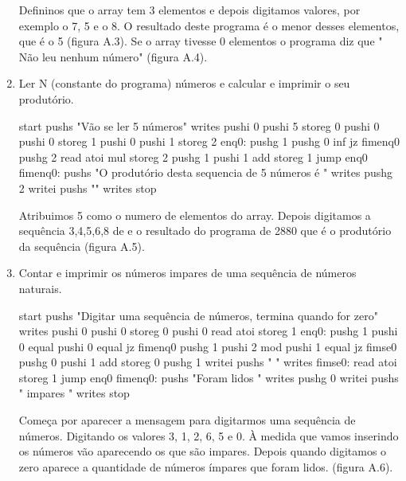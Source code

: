 \documentclass{report}
\begin{document}
\begin{enumerate}
	\indent
	Defininos que o array tem 3 elementos e depois digitamos valores, por exemplo o 7, 5 e o 8. O resultado deste programa é o menor desses elementos, que é o 5 (figura A.3). Se o array tivesse 0 elementos o programa diz que " 
	Não leu nenhum número" (figura A.4).
	\item Ler N (constante do programa) números e calcular e imprimir o seu produtório.
	
	\begin{code}
		start
		pushs "Vão se ler 5 números\n"
		writes
		pushi 0
		pushi 5
		storeg 0
		pushi 0
		pushi 0
		storeg 1
		pushi 0
		pushi 1
		storeg 2
		enq0:
		pushg 1
		pushg 0
		inf
		jz fimenq0
		pushg 2
		read
		atoi
		mul
		storeg 2
		pushg 1
		pushi 1
		add
		storeg 1
		jump enq0
		fimenq0:
		pushs "O produtório desta sequencia de 5 números é "
		writes
		pushg 2
		writei
		pushs "\n"
		writes
		stop
		
	\end{code}

	\indent
	Atribuimos 5 como o numero de elementos do array. Depois digitamos a sequência 3,4,5,6,8 de e o resultado do programa de 2880 que é o produtório da sequência (figura A.5).	
	
	\item Contar e imprimir os números impares de uma sequência de números naturais.
	
	\begin{code}
		start
		pushs "Digitar uma sequência de números, termina quando for zero\n"
		writes
		pushi 0
		pushi 0
		storeg 0
		pushi 0
		read
		atoi
		storeg 1
		enq0:
		pushg 1
		pushi 0
		equal
		pushi 0
		equal
		jz fimenq0
		pushg 1
		pushi 2
		mod
		pushi 1
		equal
		jz fimse0
		pushg 0
		pushi 1
		add
		storeg 0
		pushg 1
		writei
		pushs " \n"
		writes
		fimse0:
		read
		atoi
		storeg 1
		jump enq0
		fimenq0:
		pushs "Foram lidos "
		writes
		pushg 0
		writei
		pushs " impares \n"
		writes
		stop
		
	\end{code}
	
	\indent
	Começa por aparecer a mensagem para digitarmos uma sequência de números. 
	Digitando os valores 3, 1, 2, 6, 5 e 0. À medida que vamos inserindo os números vão aparecendo os que são impares. Depois quando digitamos o zero aparece a quantidade de números ímpares que foram lidos. (figura A.6).
	

\end{enumerate}
  
\end{document}
